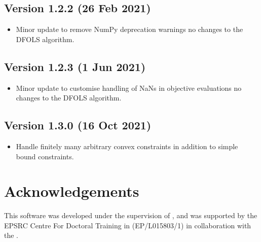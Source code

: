 \documentclass[letterpaper,10pt,english]{sphinxmanual}
\begin{document}
\section{Version 1.2.2 (26 Feb 2021)}
\label{\detokenize{history:version-1-2-2-26-feb-2021}}\begin{itemize}
\item {} 
Minor update to remove NumPy deprecation warnings \sphinxhyphen{} no changes to the DFO\sphinxhyphen{}LS algorithm.

\end{itemize}


\section{Version 1.2.3 (1 Jun 2021)}
\label{\detokenize{history:version-1-2-3-1-jun-2021}}\begin{itemize}
\item {} 
Minor update to customise handling of NaNs in objective evaluations \sphinxhyphen{} no changes to the DFO\sphinxhyphen{}LS algorithm.

\end{itemize}


\section{Version 1.3.0 (16 Oct 2021)}
\label{\detokenize{history:version-1-3-0-16-oct-2021}}\begin{itemize}
\item {} 
Handle finitely many arbitrary convex constraints in addition to simple bound constraints.

\end{itemize}


\chapter{Acknowledgements}
\label{\detokenize{index:acknowledgements}}
This software was developed under the supervision of , and was supported by the EPSRC Centre For Doctoral Training in  (EP/L015803/1) in collaboration with the .
\end{document}
